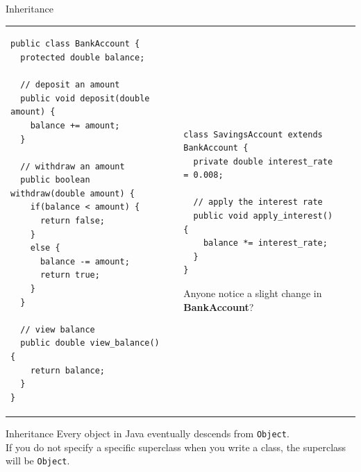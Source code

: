 \documentclass[aspectratio=169]{beamer}
\makeatletter
\newenvironment{splitslide}
{
\centering
\begin{tabular}{@{}m{0.50\textwidth} | m{0.025\textwidth}@{} m{0.4\textwidth}@{} m{0pt}@{}}
}
{
\end{tabular}
}
\makeatother
\begin{document}
\begin{frame}[fragile]{Inheritance}
\begin{splitslide}

\begin{Verbatim}[fontsize=\tiny]
public class BankAccount {
  protected double balance;
  
  // deposit an amount
  public void deposit(double amount) {
    balance += amount;
  }
  
  // withdraw an amount
  public boolean withdraw(double amount) {
    if(balance < amount) {
      return false;
    }
    else {
      balance -= amount;
      return true;
    }
  }
  
  // view balance
  public double view_balance() {
    return balance;  
  }
}
\end{Verbatim}

&&

\begin{Verbatim}[fontsize=\tiny]
class SavingsAccount extends BankAccount {
  private double interest_rate = 0.008;
  
  // apply the interest rate
  public void apply_interest() {
    balance *= interest_rate;
  }
}
\end{Verbatim}

\vspace{2em}
\raggedright
Anyone notice a slight change in \textbf{BankAccount}?

\end{splitslide}
\end{frame}



\begin{frame}{Inheritance}
Every object in Java eventually descends from \texttt{Object}. \\
\vspace{1em}
If you do not specify a specific superclass when you write a class, the superclass will be \texttt{Object}. \\
\end{frame}
\end{document}

